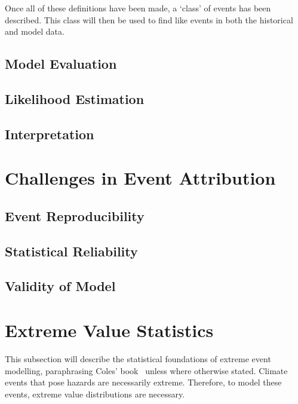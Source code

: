 Once all of these definitions have been made,
    a `class' of events has been described.
This class will then be used to find like events in both the historical and model data.

\subsection{Model Evaluation}\label{subsec:backmodeleval}

\subsection{Likelihood Estimation}\label{subsec:backlikeest}

\subsection{Interpretation}\label{subsec:backinterp}

\section{Challenges in Event Attribution}\label{sec:attrchallenge}

\subsection{Event Reproducibility}\label{subsec:eventrepro}

\subsection{Statistical Reliability}\label{subsec:statvalid}

\subsection{Validity of Model}\label{subsec:modelvalid}

\section{Extreme Value Statistics}\label{sec:exstats}

This subsection will describe the statistical foundations of extreme event modelling,
    paraphrasing Coles' book~\cite{Coles_2001} unless where otherwise stated.
Climate events that pose hazards are necessarily extreme.
Therefore, to model these events,
    extreme value distributions are necessary.

